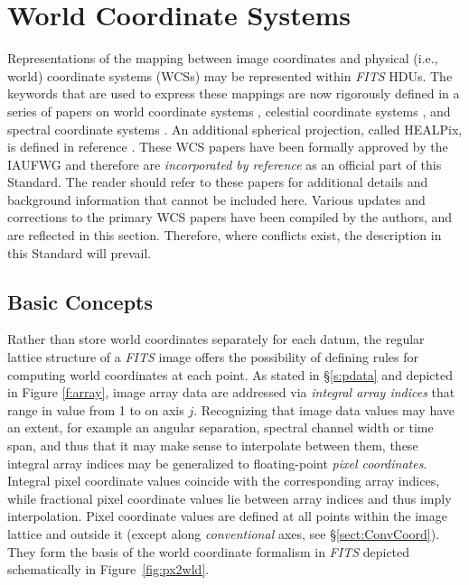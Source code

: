 \documentclass[11pt,makeidx]{book}     %
\begin{document}
\chapter{World Coordinate Systems}
\label{s:WCS}

Representations of the mapping between image coordinates and physical (i.e.,
world) coordinate systems (WCSs) may be represented within {\em FITS\/} HDUs. The keywords
that are used to express these mappings are now rigorously defined in a
series of papers on
world coordinate systems \cite{greisen02}, celestial coordinate systems
\cite{calabretta02}, and spectral coordinate systems \cite{greisen06}.  
An additional spherical projection, called HEALPix, is defined in reference 
\cite{calabretta07}.
These WCS papers have been formally
approved by the IAUFWG and therefore are {\em incorporated by reference} as an
official part of this Standard. The reader should refer to these papers for
additional details and background information that cannot be included here.
Various updates and corrections to the primary WCS papers have been compiled by
the authors, and are reflected in this section. Therefore, where conflicts exist,
the description in this Standard will prevail. 

\section{Basic Concepts}

Rather than store world coordinates separately for each datum,
the regular lattice structure of a {\em FITS\/} image offers the
possibility of defining rules for computing world coordinates
at each point.  As stated in \S\ref{s:pdata} and
depicted in Figure \ref{f:array}, 
image array data are addressed via {\em integral
array indices} that range in value from 1 to  on axis $j$.
Recognizing that image data values may have an extent, for example an
angular separation, spectral channel width or time span, and thus that
it may make sense to interpolate between them, these integral array
indices may be generalized to floating-point {\em pixel coordinates}.
Integral pixel coordinate values coincide with the corresponding array
indices, while fractional pixel coordinate values lie between array
indices and thus imply interpolation.  Pixel coordinate values are
defined at all points within the image lattice and outside it (except
along {\em conventional} axes, see \S\ref{sect:ConvCoord}). They form the basis of
the world coordinate formalism in {\em FITS\/} depicted schematically in 
Figure~\ref{fig:px2wld}. 
  
\end{document}
